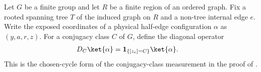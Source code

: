 \begin{definition}%
    \label{def:peps_cycle_class_detector}
    \leanok
    Let $G$ be a finite group and let $R$ be a finite region of an ordered
    graph. Fix a rooted spanning tree $T$ of the induced graph on $R$
    and a non-tree internal edge $e$. Write the exposed coordinates of a
    physical half-edge configuration $\alpha$ as $(y,a,r,z)$.
    For a conjugacy class $C$ of $G$, define the diagonal operator
    \begin{align}
        D_C\ket{\alpha} & =\mathbf1_{\{[z_e]=C\}}\ket{\alpha}.
        \label{eq:peps_cycle_class_diagonal}
    \end{align}
    This is the chosen-cycle form of the conjugacy-class measurement in
    the proof of \cite[Theorem~6.15]{Schuch2010PEPS}.
\end{definition}

